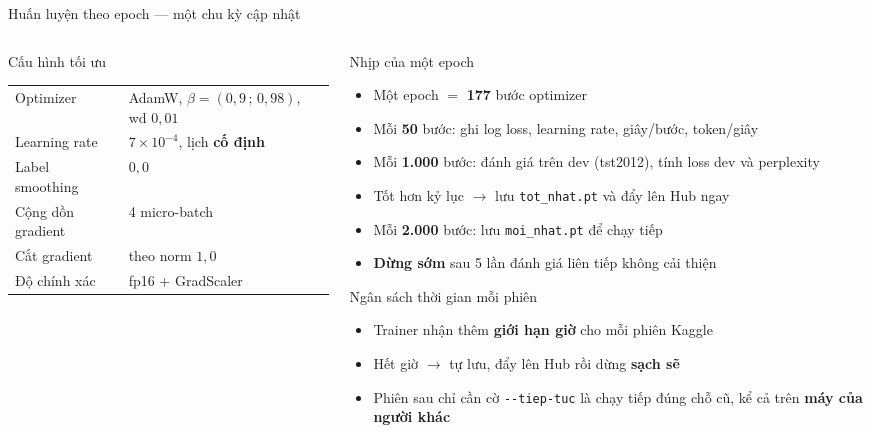 \documentclass[aspectratio=169, 10pt]{beamer}
\newcommand{\bangchat}{\setlength{\tabcolsep}{3pt}}
\begin{document}
\begin{frame}[shrink=15]{Huấn luyện theo epoch — một chu kỳ cập nhật}
  \begin{columns}[T]
    \begin{column}{0.48\textwidth}
      \begin{block}{Cấu hình tối ưu}
        \scriptsize\bangchat
        \begin{tabular}{@{}ll@{}}
          \toprule
          Optimizer         & AdamW, $\beta = (0{,}9\,;\,0{,}98)$, wd $0{,}01$ \\
          Learning rate     & $7 \times 10^{-4}$, lịch \textbf{cố định} \\
          Label smoothing   & $0{,}0$ \\
          Cộng dồn gradient & 4 micro-batch \\
          Cắt gradient      & theo norm $1{,}0$ \\
          Độ chính xác      & fp16 + GradScaler \\
          \bottomrule
        \end{tabular}
      \end{block}
    \end{column}
    \begin{column}{0.48\textwidth}
      \begin{block}{Nhịp của một epoch}
        \begin{itemize}
          \setlength{\itemsep}{0.15em}
          \item Một epoch $=$ \textbf{177} bước optimizer
          \item Mỗi \textbf{50} bước: ghi log loss, learning rate, giây/bước,
            token/giây
          \item Mỗi \textbf{1.000} bước: đánh giá trên dev (tst2012), tính loss dev và
            perplexity
          \item Tốt hơn kỷ lục $\rightarrow$ lưu \texttt{tot\_nhat.pt} và đẩy lên Hub
            ngay
          \item Mỗi \textbf{2.000} bước: lưu \texttt{moi\_nhat.pt} để chạy tiếp
          \item \textbf{Dừng sớm} sau 5 lần đánh giá liên tiếp không cải thiện
        \end{itemize}
      \end{block}
      \begin{block}{Ngân sách thời gian mỗi phiên}
        \begin{itemize}
          \setlength{\itemsep}{0.15em}
          \item Trainer nhận thêm \textbf{giới hạn giờ} cho mỗi phiên Kaggle
          \item Hết giờ $\rightarrow$ tự lưu, đẩy lên Hub rồi dừng \textbf{sạch sẽ}
          \item Phiên sau chỉ cần cờ \texttt{-{}-tiep-tuc} là chạy tiếp đúng chỗ cũ,
            kể cả trên \textbf{máy của người khác}
        \end{itemize}
      \end{block}
    \end{column}
  \end{columns}
\end{frame}
\end{document}
